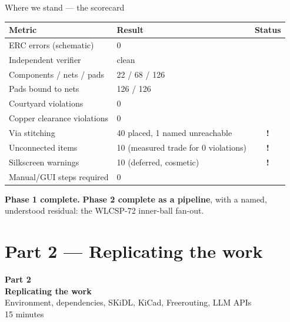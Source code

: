 \documentclass[aspectratio=169,10pt]{beamer}
\newcommand{\ok}{{\color{stgreen}\textbf{\checkmark}}}
\newcommand{\gap}{{\color{stamber}\textbf{!}}}
\begin{document}
\begin{frame}{Where we stand --- the scorecard}
\vspace{1mm}
\begin{center}\small
\begin{tabular}{@{}p{} p{} c@{}}
\toprule
\textbf{Metric} & \textbf{Result} & \textbf{Status}\\
\midrule
ERC errors (schematic) & 0 & \ok\\
Independent verifier & clean & \ok\\
Components / nets / pads & 22 / 68 / 126 & \ok\\
Pads bound to nets & 126 / 126 & \ok\\
Courtyard violations & 0 & \ok\\
Copper clearance violations & 0 & \ok\\
Via stitching & 40 placed, 1 named unreachable & \gap\\
Unconnected items & 10 (measured trade for 0 violations) & \gap\\
Silkscreen warnings & 10 (deferred, cosmetic) & \gap\\
Manual/GUI steps required & 0 & \ok\\
\bottomrule
\end{tabular}
\end{center}
\vspace{3mm}
\begin{center}\footnotesize
\textbf{Phase 1 complete.} \quad \textbf{Phase 2 complete as a pipeline}, with a named, understood residual: the WLCSP-72 inner-ball fan-out.
\end{center}
\end{frame}

\section{Part 2 --- Replicating the work}
{
\begin{frame}[plain]
\vfill
\begin{center}
{\color{stcyan}\Large\textbf{Part 2}}\\[6pt]
{\color{white}\LARGE\textbf{Replicating the work}}\\[10pt]
{\color{white}\small Environment, dependencies, SKiDL, KiCad, Freerouting, LLM APIs}\\[4pt]
{\color{stcyan}\footnotesize 15 minutes}
\end{center}
\vfill
\end{frame}}
\end{document}
